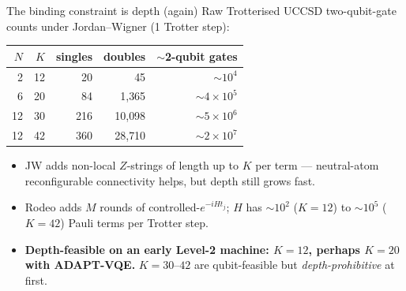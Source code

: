 \documentclass[aspectratio=169,11pt]{beamer}
\begin{document}
\begin{frame}{The binding constraint is depth (again)}
Raw Trotterised UCCSD two-qubit-gate counts under Jordan--Wigner (1 Trotter step):
\begin{center}\small
\renewcommand{\arraystretch}{1.15}
\begin{tabular}{@{}rrrrr@{}}
\toprule
$N$ & $K$ & singles & doubles & $\sim$2-qubit gates \\
\midrule
2  & 12 & 20  & 45     & $\sim\!10^{4}$ \\
6  & 20 & 84  & 1{,}365 & $\sim\!4\times10^{5}$ \\
12 & 30 & 216 & 10{,}098 & $\sim\!5\times10^{6}$ \\
12 & 42 & 360 & 28{,}710 & $\sim\!2\times10^{7}$ \\
\bottomrule
\end{tabular}
\end{center}
\begin{itemize}\small
  \item JW adds non-local $Z$-strings of length up to $K$ per term --- neutral-atom
        reconfigurable connectivity helps, but depth still grows fast.
  \item Rodeo adds $M$ rounds of controlled-$e^{-iH t_j}$; $H$ has
        $\sim\!10^{2}$ ($K{=}12$) to $\sim\!10^{5}$ ($K{=}42$) Pauli terms per Trotter step.
  \item \textbf{Depth-feasible on an early Level-2 machine: $K\!=\!12$, perhaps $K\!=\!20$
        with ADAPT-VQE.} $K\!=\!30$--$42$ are qubit-feasible but \emph{depth-prohibitive} at first.
\end{itemize}
\end{frame}
\end{document}
